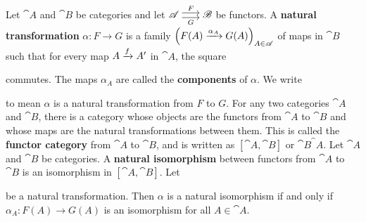  Let $\cat{A}$ and $\cat B$ be categories and let $\cat A \maps{F}{G} \cat B$ be functors. A \textbf{natural transformation} $\alpha: F \to G$ is a family $\left(F(A) \xrightarrow[]{\alpha_{A}} G(A)\right)_{A \in \mathscr{A}}$ of maps in $\cat B$ such that for every map $A \xrightarrow[]{f} A'$ in $\cat A$, the square %
 commutes. The maps $\alpha_A$ are called the \textbf{components} of $\alpha$. We write %
 to mean $\alpha$ is a natural transformation from $F$ to $G$. 
 For any two categories $\cat A$ and $\cat B$, there is a category whose objects are the functors from $\cat A$ to $\cat B$ and whose maps are the natural transformations between them. This is called the \textbf{functor category} from $\cat A$ to $\cat B$, and is written as $[\cat A, \cat B]$ or $\cat{B}^\cat{A}$.
 Let $\cat A$ and $\cat B$ be categories. A \textbf{natural isomorphism} between functors from $\cat A$ to $\cat B$ is an isomorphism in $[\cat A, \cat B]$.
 Let 
 be a natural transformation. Then $\alpha$ is a natural isomorphism if and only if $\alpha_A : F(A) \to G(A)$ is an isomorphism for all $A \in \cat A$.
